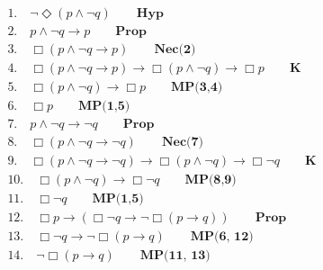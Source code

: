 \documentclass{article}
\begin{document}
    \begin{align*}
        \text{1.}\quad \neg \Diamond  (p \land \neg q) \qquad\textbf{Hyp}\\
        \text{2.}\quad p \land \neg q \rightarrow p \qquad\textbf{Prop}\\
        \text{3.}\quad \Box ( p \land \neg q \rightarrow p) \qquad\textbf{Nec(2)}\\
        \text{4.}\quad \Box (p \land \neg q \rightarrow p) \rightarrow \Box (p \land \neg q) \rightarrow \Box p \qquad\textbf{K}\\
        \text{5.}\quad \Box (p \land \neg q) \rightarrow \Box p \qquad\textbf{MP(3,4)}\\
        \text{6.}\quad \Box p \qquad\textbf{MP(1,5)}\\
        \text{7.}\quad p \land \neg q \rightarrow \neg q \qquad\textbf{Prop}\\
        \text{8.}\quad \Box ( p \land \neg q \rightarrow \neg q) \qquad\textbf{Nec(7)}\\
        \text{9.}\quad \Box (p \land \neg q \rightarrow \neg q) \rightarrow \Box (p \land \neg q) \rightarrow \Box \neg q \qquad\textbf{K}\\
        \text{10.}\quad \Box (p \land \neg q) \rightarrow \Box \neg q \qquad\textbf{MP(8,9)}\\
        \text{11.}\quad \Box \neg q \qquad\textbf{MP(1,5)}\\
        \text{12.}\quad \Box p \rightarrow (\Box \neg q \rightarrow \neg \Box (p \rightarrow q)) \qquad\textbf{Prop}\\
        \text{13.}\quad \Box \neg q \rightarrow \neg \Box (p \rightarrow q) \qquad\textbf{MP(6, 12)}\\
        \text{14.}\quad \neg \Box (p \rightarrow q) \qquad\textbf{MP(11, 13)}\\
    \end{align*}
\end{document}
